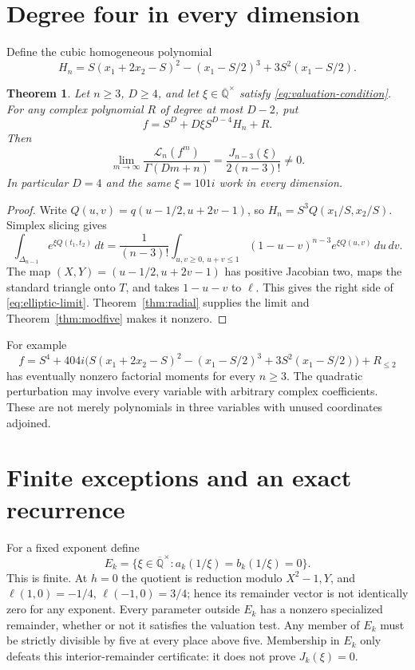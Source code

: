 \documentclass[11pt]{article}
\numberwithin{equation}{section}
\newtheorem{theorem}{Theorem}[section]
\theoremstyle{definition}
\theoremstyle{remark}
\newcommand{\Qbar}{\overline{\mathbb Q}}
\newcommand{\Lcal}{\mathcal L}
\begin{document}
\section{Degree four in every dimension}
Define the cubic homogeneous polynomial
\begin{equation}\label{eq:Hn}
 H_n=S(x_1+2x_2-S)^2-(x_1-S/2)^3+3S^2(x_1-S/2).
\end{equation}
\begin{theorem}\label{thm:elliptic-family}
Let $n\ge3$, $D\ge4$, and let $\xi\in\Qbar^\times$ satisfy
\eqref{eq:valuation-condition}. For any complex polynomial $R$ of degree at
most $D-2$, put
\begin{equation}\label{eq:elliptic-family}
 f=S^D+D\xi S^{D-4}H_n+R.
\end{equation}
Then
\begin{equation}\label{eq:elliptic-limit}
 \lim_{m\to\infty}\frac{\Lcal_n(f^m)}{\Gamma(Dm+n)}
 =\frac{J_{n-3}(\xi)}{2(n-3)!}\ne0.
\end{equation}
In particular $D=4$ and the same $\xi=101i$ work in every dimension.
\end{theorem}
\begin{proof}
Write $Q(u,v)=q(u-1/2,u+2v-1)$, so $H_n=S^3Q(x_1/S,x_2/S)$.
Simplex slicing gives
\[
 \int_{\Delta_{n-1}}e^{\xi Q(t_1,t_2)}\,dt
 =\frac1{(n-3)!}\int_{u,v\ge0,\,u+v\le1}
 (1-u-v)^{n-3}e^{\xi Q(u,v)}\,du\,dv.
\]
The map $(X,Y)=(u-1/2,u+2v-1)$ has positive Jacobian two, maps the standard
triangle onto $T$, and takes $1-u-v$ to $\ell$. This gives the right side of
\eqref{eq:elliptic-limit}. Theorem~\ref{thm:radial} supplies the limit and
Theorem~\ref{thm:modfive} makes it nonzero.
\end{proof}

For example
\[
 f=S^4+404i\bigl(S(x_1+2x_2-S)^2-(x_1-S/2)^3
                   +3S^2(x_1-S/2)\bigr)+R_{\le2}
\]
has eventually nonzero factorial moments for every $n\ge3$. The quadratic
perturbation may involve every variable with arbitrary complex coefficients.
These are not merely polynomials in three variables with unused coordinates
adjoined.

\section{Finite exceptions and an exact recurrence}\label{sec:exceptions}
For a fixed exponent define
\[
 E_k=\{\xi\in\Qbar^\times:a_k(1/\xi)=b_k(1/\xi)=0\}.
\]
This is finite. At $h=0$ the quotient is reduction modulo $X^2-1,Y$, and
$\ell(1,0)=-1/4$, $\ell(-1,0)=3/4$; hence its remainder vector is not
identically zero for any exponent. Every parameter outside $E_k$ has a
nonzero specialized remainder, whether or not it satisfies the valuation
test. Any member of $E_k$ must be strictly divisible by five at every place
above five. Membership in $E_k$ only defeats this interior-remainder
certificate: it does not prove $J_k(\xi)=0$.
\end{document}
